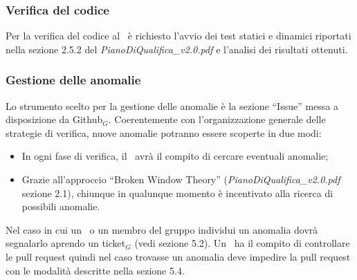 \subsubsection{Verifica del codice}
Per la verifica del codice al \ruoloVerificatore\ è richiesto l'avvio dei test statici e dinamici riportati nella sezione 2.5.2 del \textit{PianoDiQualifica\_v2.0.pdf} e l'analisi dei risultati ottenuti.

\subsubsection{Gestione delle anomalie}

Lo strumento scelto per la gestione delle anomalie è la sezione ``Issue'' messa a disposizione da Github$_G$. Coerentemente con l'organizzazione generale delle strategie di verifica, nuove anomalie potranno essere scoperte in due modi:

\begin{itemize}
	\item In ogni fase di verifica, il \ruoloVerificatore\ avrà il compito di cercare eventuali anomalie;
	\item Grazie all'approccio ``Broken Window Theory'' (\textit{PianoDiQualifica\_v2.0.pdf} sezione 2.1), chiunque in qualunque momento è incentivato alla ricerca di possibili anomalie.
\end{itemize}
Nel caso in cui un \ruoloVerificatore\ o un membro del gruppo individui un anomalia dovrà segnalarlo aprendo un ticket$_G$ (vedi sezione 5.2). Un \ruoloVerificatore\ ha il compito di controllare le pull request quindi nel caso trovasse un anomalia deve impedire la pull request con le modalità descritte nella sezione 5.4.

